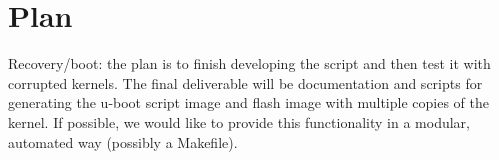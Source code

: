 \section{Plan}

Recovery/boot: the plan is to finish developing the script and then test it with
corrupted kernels.  The final deliverable will be documentation and scripts for
generating the u-boot script image and flash image with multiple copies of the
kernel.  If possible, we would like to provide this functionality in a modular,
automated way (possibly a Makefile).
